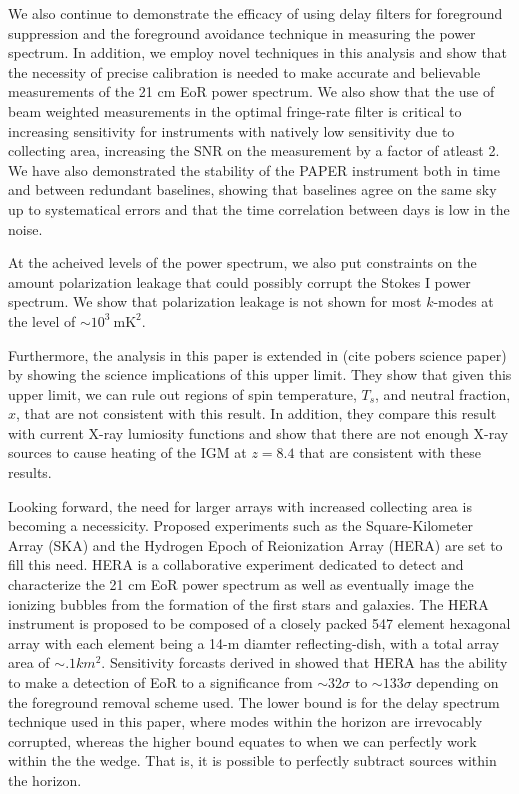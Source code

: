 \documentclass[twocolumn,numberedappendix]{emulateapj} \shorttitle{PSA64}
\begin{document}
We also continue to demonstrate the efficacy of using delay filters for
foreground suppression and the foreground avoidance technique in measuring the power
spectrum. In addition, we employ novel techniques in this analysis and show that
the necessity of precise calibration is needed to make accurate and believable
measurements of the 21 cm EoR power spectrum. We also show that the use of beam
weighted measurements in the optimal fringe-rate filter is critical to
increasing sensitivity for instruments with natively low sensitivity due to
collecting area, increasing the SNR on the measurement by a factor of atleast 2.
We have also demonstrated the stability of the PAPER instrument both in time and
between redundant baselines, showing that baselines agree on the same sky up to
systematical errors and that the time correlation between days is low in the
noise.

At the acheived levels of the power spectrum, we also put constraints on the
amount polarization leakage that could possibly corrupt the Stokes I power
spectrum. We show that polarization leakage is not shown for most $k$-modes at
the level of $\sim10^{3}\ \text{mK}^{2}$. 

Furthermore, the analysis in this paper is extended in (cite pobers science
paper) by showing the science implications of this upper limit. They show that
given this upper limit, we can rule out regions of spin temperature, $T_{s}$,
and neutral fraction, $x$, that are not consistent with this result. In
addition, they compare this result with current X-ray lumiosity functions and
show that there are not enough X-ray sources to cause heating of the IGM at
$z=8.4$ that are consistent with these results.

Looking forward, the need for larger arrays with increased collecting area is
becoming a necessicity. Proposed experiments such as the Square-Kilometer Array
(SKA) and the Hydrogen Epoch of Reionization Array (HERA) are set to fill this
need. HERA is a collaborative experiment dedicated to detect and characterize
the 21 cm EoR power spectrum as well as eventually image the ionizing bubbles
from the formation of the first stars and galaxies. The HERA instrument
is proposed to be composed of a closely packed 547 element hexagonal array 
\citep{pober_et_al2014} with each element being a 14-m diamter
reflecting-dish, with a total array area of $\sim.1km^{2}$. Sensitivity forcasts
derived in \citet{pober_et_al2014} showed that HERA has the ability to make a
detection of EoR to a significance from $\sim32\sigma$ to $\sim133\sigma$
depending on the foreground removal scheme used. The lower bound is for the
delay spectrum technique used in this paper, where modes within the horizon are
irrevocably corrupted, whereas the higher bound equates to when we can perfectly
work within the the wedge. That is, it is possible to perfectly subtract sources
within the horizon.
\end{document}
